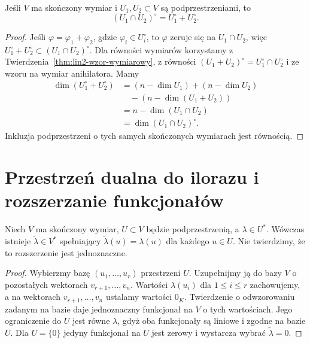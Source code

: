 \begin{twierdzenie}
\label{thm:lin7-anihilator-przeciecia}
Jeśli \(V\) ma skończony wymiar
i \(U_1,U_2\subset V\) są
podprzestrzeniami, to
\[
 (U_1\cap U_2)^\circ
 =U_1^\circ+U_2^\circ.
\]
\end{twierdzenie}
\begin{proof}
Jeśli
\(\varphi=\varphi_1+\varphi_2\),
gdzie \(\varphi_i\in U_i^\circ\),
to \(\varphi\) zeruje się na
\(U_1\cap U_2\), więc
\(U_1^\circ+U_2^\circ
 \subset (U_1\cap U_2)^\circ\).
Dla równości wymiarów
korzystamy z
Twierdzenia~\ref{thm:lin2-wzor-wymiarowy},
z równości
\((U_1+U_2)^\circ
=U_1^\circ\cap U_2^\circ\)
i ze wzoru na wymiar anihilatora.
Mamy
\[
\begin{aligned}
 \dim(U_1^\circ+U_2^\circ)
 &= (n-\dim U_1)+(n-\dim U_2)\\
 &\quad -(n-\dim(U_1+U_2))\\
 &=n-\dim(U_1\cap U_2)\\
 &=\dim(U_1\cap U_2)^\circ.
\end{aligned}
\]
Inkluzja podprzestrzeni o tych
samych skończonych wymiarach
jest równością.
\end{proof}

\section{Przestrzeń dualna do ilorazu i rozszerzanie funkcjonałów}
\label{sec:lin7-dual-ilorazu}

\begin{twierdzenie}
\label{thm:lin7-rozszerzanie}
Niech \(V\) ma skończony wymiar,
\(U\subset V\) będzie podprzestrzenią,
a \(\lambda\in U^*\).
Wówczas istnieje
\(\widetilde\lambda\in V^*\)
spełniający
\(\widetilde\lambda(u)=\lambda(u)\)
dla każdego \(u\in U\).
Nie twierdzimy, że to rozszerzenie
jest jednoznaczne.
\end{twierdzenie}
\begin{proof}
Wybierzmy bazę
\((u_1,\ldots,u_r)\) przestrzeni \(U\).
Uzupełnijmy ją do bazy \(V\)
o pozostałych wektorach
\(v_{r+1},\ldots,v_n\).
Wartości \(\lambda(u_i)\)
dla \(1\leq i\leq r\)
zachowujemy, a na wektorach
\(v_{r+1},\ldots,v_n\)
ustalamy wartości \(0_K\).
Twierdzenie o odwzorowaniu zadanym
na bazie daje jednoznaczny funkcjonał
na \(V\) o tych wartościach.
Jego ograniczenie do \(U\)
jest równe \(\lambda\),
gdyż oba funkcjonały są liniowe
i zgodne na bazie \(U\).
Dla \(U=\{0\}\) jedyny funkcjonał
na \(U\) jest zerowy i wystarcza
wybrać \(\widetilde\lambda=0\).
\end{proof}

